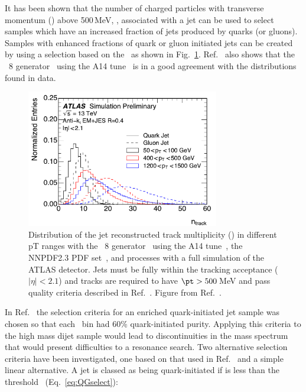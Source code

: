 
It has been shown that   the number of charged particles with transverse momentum (\pt ) above 500\,MeV, 
\ntrk, associated with a jet can be used to select samples which have an increased fraction of 
jets produced by quarks (or gluons). Samples with enhanced fractions of quark or gluon initiated jets can be created by 
using a selection based on the \ntrk\ as shown in Fig.~\ref{fig:jet_pt_quark_gluon}. Ref.~\cite{ATL-PHYS-PUB-2017-009} 
also shows that the \Pythia~8 generator~\cite{pythia8} using the A14 tune~\cite{A14tune} is in a good agreement with 
the distributions found in data.


\begin{figure}[htb]
 \centering
\includegraphics[width=0.75\textwidth]{figures/tagging/fig_01_ATL-PHYS-PUB-2017-009.pdf}
\caption{Distribution of the jet reconstructed track multiplicity (\ntrk ) in different pT ranges with the 
\Pythia~8 generator~\cite{pythia8} using the A14 tune~\cite{A14tune}, the NNPDF2.3 PDF set~\cite{Carrazza:2013axa}, 
and processes with a full simulation of the ATLAS detector. Jets must be fully within the tracking acceptance 
($|\eta|<2.1$) and tracks are required to have $\pt > 500$\,MeV and pass  quality criteria described in 
Ref.~\cite{ATL-PHYS-PUB-2017-009}. Figure from Ref.~\cite{ATL-PHYS-PUB-2017-009}. \label{fig:jet_pt_quark_gluon}}
\end{figure}

In Ref.~\cite{ATL-PHYS-PUB-2017-009}  the selection criteria for  an enriched quark-initiated jet sample was chosen so that 
each \pt\ bin had 60\% quark-initiated purity. Applying this criteria to the high mass dijet sample would lead to 
discontinuities in the mass spectrum that would present difficulties to a resonance search. Two alternative selection
criteria have been investigated, one based on that used in Ref.~\cite{ATL-PHYS-PUB-2017-009} and a simple linear
alternative. A jet is classed as being quark-initiated if \ntrk is less than the threshold \nqg\ (Eq.~\ref{eq:QGselect}):

